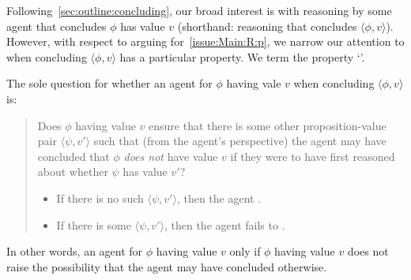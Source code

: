 \begin{note}[Introduction]
  Following~\autoref{sec:outline:concluding}, our broad interest is with reasoning by some agent that concludes \(\phi\) has value \(v\) (shorthand: reasoning that concludes \(\langle \phi,v \rangle\)).
  However, with respect to arguing for~\autoref{issue:Main:R:p}, we narrow our attention to when concluding \(\langle \phi,v \rangle\) has a particular property.
  We term the property `\csN{}'.

  The sole question for whether an agent \csV{} for \(\phi\) having vale \(v\) when concluding \(\langle \phi, v \rangle\) is:
  \begin{quote}
    Does \(\phi\) having value \(v\) ensure that there is some other proposition-value pair \(\langle \psi,v' \rangle\) such that (from the agent's perspective) the agent may have concluded that \(\phi\) \emph{does not} have value \(v\) if they were to have first reasoned about whether \(\psi\) has value \(v'\)?
    \begin{itemize}
    \item If there is no such \(\langle \psi,v' \rangle\), then the agent \csN{}.
    \item If there is some \(\langle \psi,v' \rangle\), then the agent fails to \csN{}.
    \end{itemize}
  \end{quote}

  In other words, an agent \csV{} for \(\phi\) having value \(v\) only if \(\phi\) having value \(v\) does not raise the possibility that the agent may have concluded otherwise.
\end{note}

